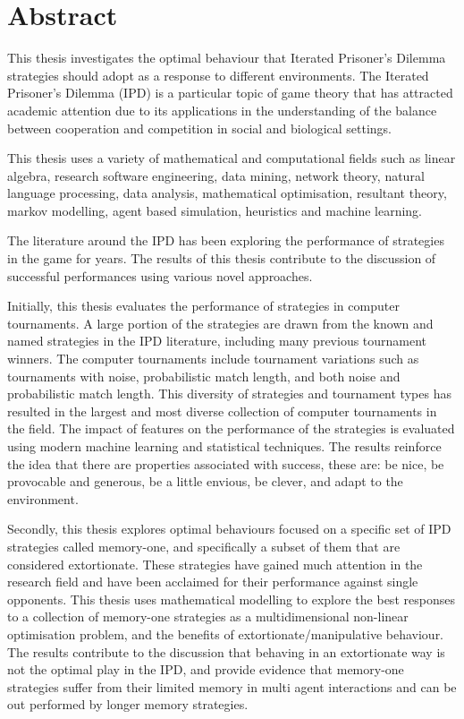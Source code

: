 \chapter{Abstract}

This thesis investigates the optimal behaviour that Iterated Prisoner's Dilemma
strategies should adopt as a response to different environments. The Iterated
Prisoner's Dilemma (IPD) is a particular topic of game theory that has attracted
academic attention due to its applications in the understanding of
the balance between cooperation and competition in social and biological
settings.

This thesis uses a variety of mathematical and computational fields such as
linear algebra, research software engineering, data mining, network
theory, natural language processing, data analysis, mathematical
optimisation, resultant theory, markov modelling, agent based simulation,
heuristics and machine learning.

The literature around the IPD has been exploring the performance of strategies
in the game for years. The results of this thesis contribute to the discussion
of successful performances using various novel approaches.

Initially, this thesis evaluates the performance of \numberofstrategies
strategies in \numberofalltournaments computer tournaments. A large portion of
the \numberofstrategies strategies are drawn from the known and named strategies in the IPD
literature, including many previous tournament winners. The \numberofalltournaments
computer tournaments include tournament variations such as tournaments with
noise, probabilistic match length, and both noise and probabilistic match
length. This diversity of strategies and tournament types has resulted in the largest and
most diverse collection of computer tournaments in the field. The impact of
features on the performance of the \numberofstrategies strategies is evaluated
using modern machine learning and statistical techniques. The results reinforce
the idea that there are properties associated with success, these are: be nice,
be provocable and generous, be a little envious, be clever, and adapt to the
environment.

Secondly, this thesis explores optimal behaviours focused on a specific set of
IPD strategies called memory-one, and specifically a subset of them that are
considered extortionate. These strategies have gained much attention in the
research field and have been acclaimed for their performance against single
opponents. This thesis uses  mathematical modelling to explore the best
responses to a collection of memory-one strategies as a multidimensional non-linear
optimisation problem, and the benefits of extortionate/manipulative
behaviour. The results contribute to the discussion that behaving in an
extortionate way is not the optimal play in the IPD, and provide evidence that
memory-one strategies suffer from their limited memory in multi agent
interactions and can be out performed by longer memory strategies.

